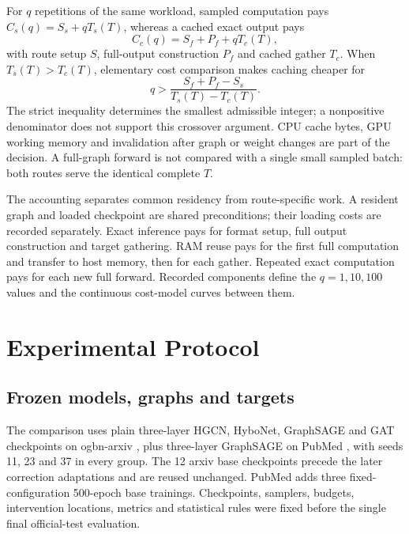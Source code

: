 \documentclass[sigconf, nonacm]{acmart}
\begin{document}
For $q$ repetitions of the same workload, sampled computation pays $C_s(q)=S_s+qT_s(T)$, whereas a cached exact output pays
\begin{equation}
C_c(q)=S_f+P_f+qT_c(T),
\label{eq:cache}
\end{equation}
with route setup $S$, full-output construction $P_f$ and cached gather $T_c$. When $T_s(T)>T_c(T)$, elementary cost comparison makes caching cheaper for
\begin{equation}
q>\frac{S_f+P_f-S_s}{T_s(T)-T_c(T)}.
\label{eq:breakeven}
\end{equation}
The strict inequality determines the smallest admissible integer; a nonpositive denominator does not support this crossover argument. CPU cache bytes, GPU working memory and invalidation after graph or weight changes are part of the decision. A full-graph forward is not compared with a single small sampled batch: both routes serve the identical complete $T$.

The accounting separates common residency from route-specific work. A resident graph and loaded checkpoint are shared preconditions; their loading costs are recorded separately. Exact inference pays for format setup, full output construction and target gathering. RAM reuse pays for the first full computation and transfer to host memory, then for each gather. Repeated exact computation pays for each new full forward. Recorded components define the $q=1,10,100$ values and the continuous cost-model curves between them.

\section{Experimental Protocol}
\label{sec:protocol}
\subsection{Frozen models, graphs and targets}
The comparison uses plain three-layer HGCN, HyboNet, GraphSAGE and GAT checkpoints on ogbn-arxiv \cite{hu2020open}, plus three-layer GraphSAGE on PubMed \cite{yang2016revisiting}, with seeds 11, 23 and 37 in every group. The 12 arxiv base checkpoints precede the later correction adaptations and are reused unchanged. PubMed adds three fixed-configuration 500-epoch base trainings. Checkpoints, samplers, budgets, intervention locations, metrics and statistical rules were fixed before the single final official-test evaluation.
\end{document}
